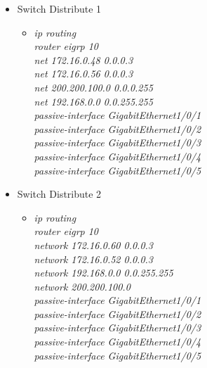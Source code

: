 \documentclass[a4paper, 12pt]{article}
\begin{document}
\begin{itemize}
\begin{itemize}
\begin{itemize}
          \end{itemize}
             \item Switch Distribute 1
        \begin{itemize}
         \item \textit{ip routing\\
                        router eigrp 10\\
                        net 172.16.0.48 0.0.0.3 \\
                        net 172.16.0.56 0.0.0.3 \\
                        net 200.200.100.0 0.0.0.255 \\
                        net 192.168.0.0 0.0.255.255 \\
                        passive-interface GigabitEthernet1/0/1\\
                        passive-interface GigabitEthernet1/0/2\\
                        passive-interface GigabitEthernet1/0/3\\
                        passive-interface GigabitEthernet1/0/4\\
                        passive-interface GigabitEthernet1/0/5\\}
         
          \end{itemize}
             \item Switch Distribute 2
        \begin{itemize}
         \item \textit{ip routing\\
            router eigrp 10\\
            network 172.16.0.60 0.0.0.3\\
            network 172.16.0.52 0.0.0.3\\
            network 192.168.0.0 0.0.255.255\\
            network 200.200.100.0\\
            passive-interface GigabitEthernet1/0/1\\
            passive-interface GigabitEthernet1/0/2\\
            passive-interface GigabitEthernet1/0/3\\
            passive-interface GigabitEthernet1/0/4\\
            passive-interface GigabitEthernet1/0/5\\}
         
          \end{itemize}
       \end{itemize}
     

\end{itemize}
\end{document}
